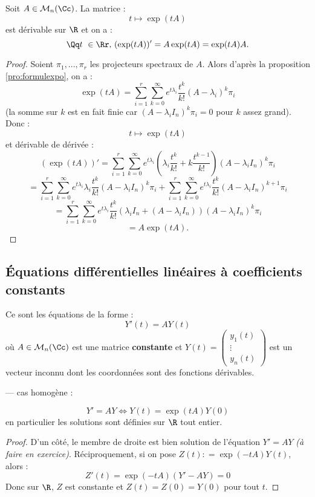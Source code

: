 \documentclass[class=report,crop=false]{standalone}
\newcommand{\exoo}{\emph{(à faire en exercice)}}
\begin{document}
\begin{proposition}
Soit $A \in \mathcal{M}_n(\Cc)$. La matrice :
\[t \mapsto \exp (tA)\]
est dérivable sur $\R$ et on a :
\[\Qq t\ \in \Rr, \, (\exp (t A)) ' = A \exp(tA) =  \exp (tA) A .\]
\end{proposition}

\begin{proof}
Soient $\pi_1,...,\pi_r$ les projecteurs spectraux de $A$. Alors d'après la proposition \ref{pro:formulexpo}, on a :
\[\exp (tA) = \sum_{i=1}^r\sum_{k=0}^\infty e^{t\lambda_i}\frac{t^k}{k!} (A-\lambda_i)^k\pi_i\]
(la somme sur $k$ est en fait finie car $(A-\lambda_iI_n)^k\pi_i = 0$ pour $k$ assez grand). Donc :
\[t \mapsto \exp (tA) \]
et dérivable de dérivée :
\[(\exp (tA))' = \sum_{i=1}^r \sum_{k=0}^\infty e^{t\lambda_i}(\lambda_i \frac{t^k}{k!} + k \frac{t^{k-1}}{k!}) (A-\lambda_iI_n)^k\pi_i\]
\[ = \sum_{i=1}^r \sum_{k=0}^\infty e^{t\lambda_i}\lambda_i \frac{t^k}{k!}(A-\lambda_iI_n)^k\pi_i + \sum_{i=1}^r \sum_{k=0}^\infty e^{t\lambda_i} \frac{t^{k}}{k!}(A-\lambda_iI_n)^{k+1}\pi_i\]
\[=\sum_{i=1}^r \sum_{k=0}^\infty e^{t\lambda_i} \frac{t^k}{k!}(\lambda_iI_n + (A-\lambda_iI_n)) (A-\lambda_iI_n)^k\pi_i \]
\[= A \exp (tA) .\] 
\end{proof}

\subsection{\'Equations différentielles linéaires à coefficients constants}

Ce sont les équations de la forme :
\[Y'(t) =AY(t) \]
où $A \in \mathcal{M}_n(\Cc)$ est une matrice {\bf constante} et $Y(t)=\left(\begin{array}{c}
y_1(t)\\
\vdots\\
y_n(t)
\end{array}\right)$ est un vecteur inconnu dont les coordonnées sont des fonctions dérivables.
 
--- cas homogène :

\begin{theoreme}
\[Y' = AY \iff Y(t) = \exp(tA)Y(0)\]
en particulier les solutions sont définies sur $\R$ tout entier.
\end{theoreme}

\begin{proof}
D'un côté, le membre de droite est bien solution de l'équation $Y' = AY$ \exoo. Réciproquement, si on pose $Z(t) : = \exp(-tA)Y(t)$, alors :
\[Z'(t) = \exp (-tA) (Y'-AY) = 0\]
Donc sur $\R$, $Z$ est constante et $Z(t) = Z(0) = Y(0)$ pour tout $t$. 
\end{proof}
\end{document}
